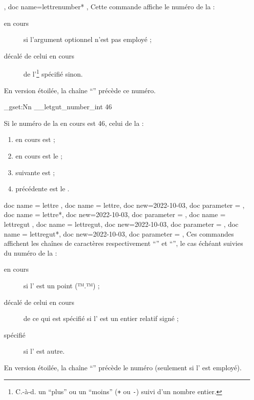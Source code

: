 \documentclass{letgut}
\begin{document}
\begin{docCommands}[
    doc new=2022-10-03,
    doc name=lettrenumber,
    doc parameter = \oarg{entier relatif signé}
  ]
  {
    { },
    { doc name=lettrenumber* },
  }
  Cette commande affiche le numéro de la  :
  \begin{description}
  \item[en cours] si l'argument optionnel n'est pas employé ;
  \item[décalé de celui en cours] de l'\footnote{\label{entier-signe}C.-à-d. un \enquote{plus} ou un
      \enquote{moins} (\lstinline|+| ou \lstinline|-|) suivi d'un nombre
      entier.} spécifié sinon.
  \end{description}
  En version étoilée, la chaîne \enquote{\no{}} précède ce numéro.
\end{docCommands}

\ExplSyntaxOn
\int_gset:Nn \g__letgut_number_int {46}
\ExplSyntaxOff

\begin{ltx-code-result}[title addon=emploi de la commande \refCom{lettrenumber},listing options app={deletekeywords={[6]{cours,lettre}}}]
Si le numéro de la  en cours est 46,
celui de la  :
\begin{enumerate}
\item en cours est  ;
\item en cours est le  ;
\item suivante est  ;
\item précédente est le .
\end{enumerate}
\end{ltx-code-result}

\begin{docCommands}[]
  {
    { doc name = lettre },
    { doc name = lettre,  doc new=2022-10-03, doc parameter =  },
    { doc name = lettre*, doc new=2022-10-03, doc parameter =  },
    { doc name = lettregut },
    { doc name = lettregut,  doc new=2022-10-03, doc parameter =  },
    { doc name = lettregut*, doc new=2022-10-03, doc parameter =  },
  }
  Ces commandes affichent les chaînes de caractères respectivement
  \enquote{} et \enquote{}, le cas échéant suivies du numéro
  de la  :
  \begin{description}
  \item[en cours] si l' est un point (™.™) ;
  \item[décalé de celui en cours] de ce qui est spécifié si l' est un
    entier relatif signé ;
  \item[spécifié] si l' est autre.
  \end{description}
  En version étoilée, la chaîne \enquote{\no{}} précède le numéro (seulement si
  l' est employé).
\end{docCommands}
\end{document}
